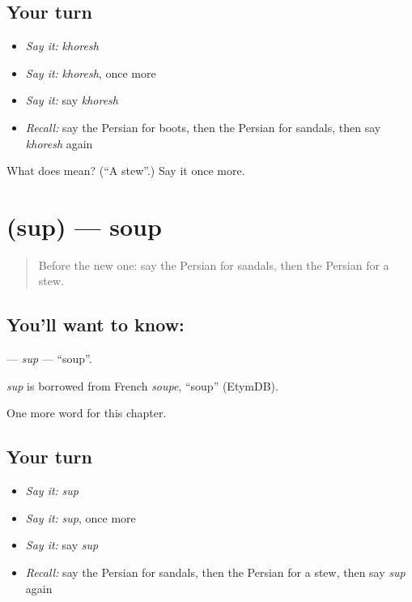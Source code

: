 \subsection*{Your turn}
\begin{itemize}
\raggedright
  \item \emph{Say it:} \emph{khoresh}
  \item \emph{Say it:} \emph{khoresh}, once more
  \item \emph{Say it:} say \emph{khoresh}
  \item \emph{Recall:} say the Persian for boots, then the Persian for sandals, then say \emph{khoresh} again
\end{itemize}

\begin{tcolorbox}[breakable,colback=teal!4,colframe=teal!35!black,title={Before you move on}]
What does  mean? (\textquotedblleft{}A stew\textquotedblright{}.) Say it once more.
\end{tcolorbox}
\section[\texorpdfstring{\fa{سوپ} (sup)}{سوپ (sup)}]{ (sup) — soup}

\label{lesson:FA-C98-sup}



\begin{quote}
Before the new one: say the Persian for sandals, then the Persian for a stew.
\end{quote}

\subsection*{You'll want to know: }
\textbf{} — \emph{sup} — \textquotedblleft{}soup\textquotedblright{}.

\begin{cousinweb}
\emph{sup} is borrowed from French \emph{soupe}, \textquotedblleft{}soup\textquotedblright{} (EtymDB).
\end{cousinweb}

\begin{grammarlens}[title={What you've built}]
One more word for this chapter.
\end{grammarlens}

\subsection*{Your turn}
\begin{itemize}
\raggedright
  \item \emph{Say it:} \emph{sup}
  \item \emph{Say it:} \emph{sup}, once more
  \item \emph{Say it:} say \emph{sup}
  \item \emph{Recall:} say the Persian for sandals, then the Persian for a stew, then say \emph{sup} again
\end{itemize}


